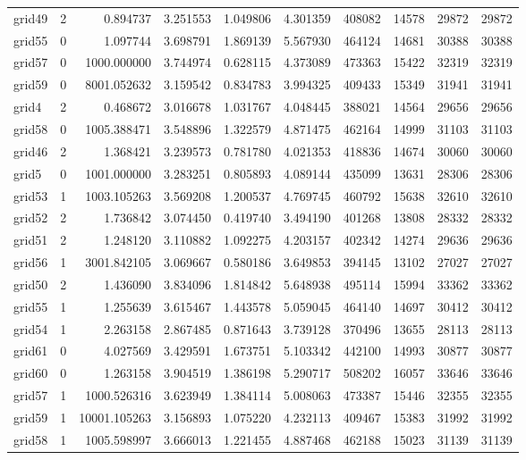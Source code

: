 \begin{longtable}{|l|r|r|r|r|r|r|r|r|r|}
grid49 & 2 & 0.894737 & 3.251553 & 1.049806 & 4.301359 & 408082 & 14578 & 29872 & 29872 \\
grid55 & 0 & 1.097744 & 3.698791 & 1.869139 & 5.567930 & 464124 & 14681 & 30388 & 30388 \\
grid57 & 0 & 1000.000000 & 3.744974 & 0.628115 & 4.373089 & 473363 & 15422 & 32319 & 32319 \\
grid59 & 0 & 8001.052632 & 3.159542 & 0.834783 & 3.994325 & 409433 & 15349 & 31941 & 31941 \\
grid4 & 2 & 0.468672 & 3.016678 & 1.031767 & 4.048445 & 388021 & 14564 & 29656 & 29656 \\
grid58 & 0 & 1005.388471 & 3.548896 & 1.322579 & 4.871475 & 462164 & 14999 & 31103 & 31103 \\
grid46 & 2 & 1.368421 & 3.239573 & 0.781780 & 4.021353 & 418836 & 14674 & 30060 & 30060 \\
grid5 & 0 & 1001.000000 & 3.283251 & 0.805893 & 4.089144 & 435099 & 13631 & 28306 & 28306 \\
grid53 & 1 & 1003.105263 & 3.569208 & 1.200537 & 4.769745 & 460792 & 15638 & 32610 & 32610 \\
grid52 & 2 & 1.736842 & 3.074450 & 0.419740 & 3.494190 & 401268 & 13808 & 28332 & 28332 \\
grid51 & 2 & 1.248120 & 3.110882 & 1.092275 & 4.203157 & 402342 & 14274 & 29636 & 29636 \\
grid56 & 1 & 3001.842105 & 3.069667 & 0.580186 & 3.649853 & 394145 & 13102 & 27027 & 27027 \\
grid50 & 2 & 1.436090 & 3.834096 & 1.814842 & 5.648938 & 495114 & 15994 & 33362 & 33362 \\
grid55 & 1 & 1.255639 & 3.615467 & 1.443578 & 5.059045 & 464140 & 14697 & 30412 & 30412 \\
grid54 & 1 & 2.263158 & 2.867485 & 0.871643 & 3.739128 & 370496 & 13655 & 28113 & 28113 \\
grid61 & 0 & 4.027569 & 3.429591 & 1.673751 & 5.103342 & 442100 & 14993 & 30877 & 30877 \\
grid60 & 0 & 1.263158 & 3.904519 & 1.386198 & 5.290717 & 508202 & 16057 & 33646 & 33646 \\
grid57 & 1 & 1000.526316 & 3.623949 & 1.384114 & 5.008063 & 473387 & 15446 & 32355 & 32355 \\
grid59 & 1 & 10001.105263 & 3.156893 & 1.075220 & 4.232113 & 409467 & 15383 & 31992 & 31992 \\
grid58 & 1 & 1005.598997 & 3.666013 & 1.221455 & 4.887468 & 462188 & 15023 & 31139 & 31139 \\

\end{longtable}
